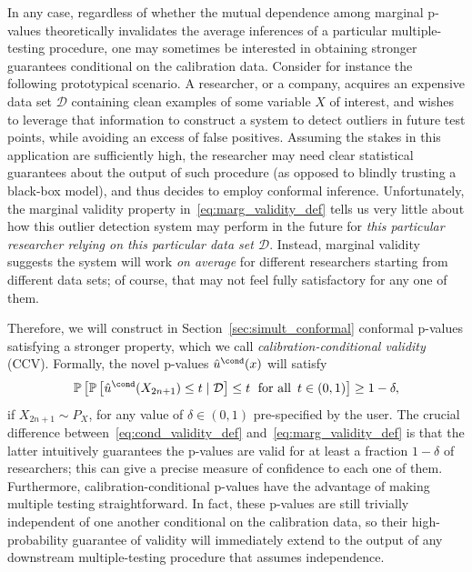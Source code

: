 In any case, regardless of whether the mutual dependence among marginal p-values theoretically invalidates the average inferences of a particular multiple-testing procedure, one may sometimes be interested in obtaining stronger guarantees conditional on the calibration data.
Consider for instance the following prototypical scenario.
A researcher, or a company, acquires an expensive data set $\mathcal{D}$ containing clean examples of some variable $X$ of interest, and wishes to leverage that information to construct a system {to} detect outliers in future test points, while avoiding an excess of false positives. Assuming the stakes in this application are sufficiently high, the researcher may need clear statistical guarantees about the output of such procedure (as opposed to blindly trusting a black-box model), and thus decides to employ conformal inference. Unfortunately, the marginal validity property in~\eqref{eq:marg_validity_def} tells us very little about how this outlier detection system may perform in the future for {\em this particular researcher relying on this particular data set $\mathcal{D}$}. Instead, marginal validity suggests the system will work {\em on average} for different researchers starting from different data sets; of course, that may not feel fully satisfactory for any one of them.

Therefore, we will construct in Section~\ref{sec:simult_conformal} conformal p-values satisfying a stronger property, which we call \emph{calibration-conditional validity} (CCV). Formally, the novel p-values $\hat{u}^\cond(x)$ will satisfy
\begin{equation}  \label{eq:cond_validity_def}
    \mathbb{P}\left[ \mathbb{P}\left[ \hat{u}^\cond(X_{2n+1}) \leq t \mid \mathcal{D} \right] \leq t \text{\; for all \,} t \in (0,1) \right] \geq 1-\delta,
\end{equation}
if $X_{2n+1} \sim P_X$, for any value of $\delta \in (0,1)$ pre-specified by the user.
The crucial difference between~\eqref{eq:cond_validity_def} and~\eqref{eq:marg_validity_def} is that the latter intuitively guarantees the p-values are valid for at least a fraction $1 - \delta$ of researchers; this can give a precise measure of confidence {to each one of them.}
Furthermore, calibration-conditional p-values have the advantage of making multiple testing straightforward. In fact, these p-values are still trivially independent of one another conditional on the calibration data, so their high-probability guarantee of validity will immediately extend to the output of any downstream multiple-testing procedure that assumes independence.

